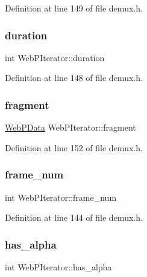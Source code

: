 Definition at line 149 of file demux.\+h.

\mbox{\label{struct_web_p_iterator_aa023f08493f26ccc06c90b56d0c2cb45}} 
\subsubsection{\texorpdfstring{duration}{duration}}
{\footnotesize\ttfamily int Web\+P\+Iterator\+::duration}



Definition at line 148 of file demux.\+h.

\mbox{\label{struct_web_p_iterator_a59a5f135561e2ad52a32e25886dbd164}} 
\subsubsection{\texorpdfstring{fragment}{fragment}}
{\footnotesize\ttfamily \mbox{\hyperlink{struct_web_p_data}{Web\+P\+Data}} Web\+P\+Iterator\+::fragment}



Definition at line 152 of file demux.\+h.

\mbox{\label{struct_web_p_iterator_ad2b5cf78971b868cd0e1d3c361c3719f}} 
\subsubsection{\texorpdfstring{frame\_num}{frame\_num}}
{\footnotesize\ttfamily int Web\+P\+Iterator\+::frame\+\_\+num}



Definition at line 144 of file demux.\+h.

\mbox{\label{struct_web_p_iterator_a89b14b410bcb042d7621d4b5cfb5b540}} 
\subsubsection{\texorpdfstring{has\_alpha}{has\_alpha}}
{\footnotesize\ttfamily int Web\+P\+Iterator\+::has\+\_\+alpha}



